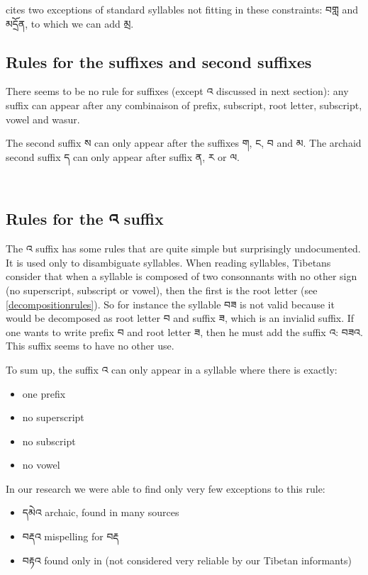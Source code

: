 \documentclass[%
a4paper,%
pagesize,%
12pt,%
parskip=off,%
bibliography=totoc,%
numbers=noenddot,%
DIV=12,%
twoside=semi,%
headings=normal%
]{scrartcl}
\begin{document}
\cite{TsheshabGrammarTopics} cites two exceptions of standard syllables not fitting in these constraints: བགླ and མདྲོན, to which we can add མྲ.

\subsection{Rules for the suffixes and second suffixes}

There seems to be no rule for suffixes (except འ discussed in next section): any suffix can appear after any combinaison of prefix, subscript, root letter, subscript, vowel and wasur.

The second suffix ས can only appear after the suffixes ག, ང, བ and མ. The archaid second suffix ད can only appear after suffix ན, ར or ལ.

­\subsection{Rules for the འ suffix}

The འ suffix has some rules that are quite simple but surprisingly undocumented. It is used only to disambiguate syllables. When reading syllables, Tibetans consider that when a syllable is composed of two consonnants with no other sign (no superscript, subscript or vowel), then the first is the root letter (see \ref{decompositionrules}). So for instance the syllable བཟ is not valid because it would be decomposed as root letter བ and suffix ཟ, which is an invialid suffix. If one wants to write prefix བ and root letter ཟ, then he must add the suffix འ: བཟའ. This suffix seems to have no other use. 

To sum up, the suffix འ can only appear in a syllable where there is exactly:

\begin{itemize}
\item one prefix
\item no superscript
\item no subscript
\item no vowel
\end{itemize}

In our research we were able to find only very few exceptions to this rule: 

\begin{itemize}
\item དམེའ archaic, found in many sources
\item བརྡའ mispelling for བརྡ
\item བརྟའ found only in \cite{KhartoTenses} (not considered very reliable by our Tibetan informants)
\end{itemize}
\end{document}
